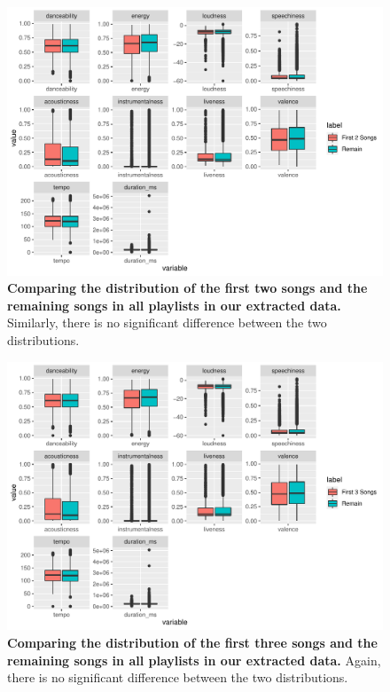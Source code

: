 \documentclass[12pt]{article}
\theoremstyle{plain}
\theoremstyle{definition}
\theoremstyle{remark}
\begin{document}
\begin{figure}[htp]
    \centering
    \includegraphics[width=\textwidth]{Images/1st2.pdf}
    \caption{\textbf{Comparing the distribution of the first two songs and the remaining songs in all playlists in our extracted data.} Similarly, there is no significant difference between the two distributions.}
    \label{fig:1st2}
\end{figure}

\begin{figure}[htp]
    \centering
    \includegraphics[width=\textwidth]{Images/1st3.pdf}
    \caption{\textbf{Comparing the distribution of the first three songs and the remaining songs in all playlists in our extracted data.} Again, there is no significant difference between the two distributions.}
    \label{fig:1st3}
\end{figure}
\end{document}
